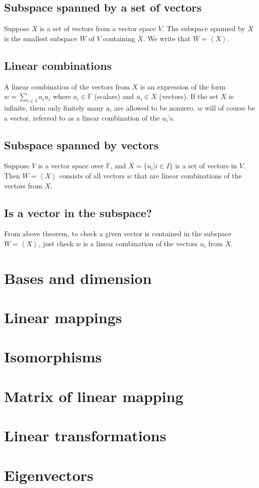 \documentclass[12pt]{article}
\begin{document}
	\subsection{Subspace spanned by a set of vectors}
	\begin{thm}
		Suppose $X$ is a set of vectors from a vector space $V$. The subspace spanned by $X$ is the smallest subspace $W$ of $V$ containing $X$. We write that $W = \left< X \right>$.
	\end{thm}
	
	\subsection{Linear combinations}
	\begin{defn}
		A linear combination of the vectors from $X$ is an expression of the form $w = \sum_{i \in I} a_i u_i$ where $a_i \in \mathbb{F}$ (scalars) and $u_i \in X$ (vectors).
		If the set $X$ is infinite, them only finitely many $a_i$ are allowed to be nonzero. $w$ will of course be a vector, referred to as a linear combination of the $u_i$'s.
	\end{defn}
	
	\subsection{Subspace spanned by vectors}
	\begin{thm}
		Suppose $V$ is a vector space over $\mathbb{F}$, and $X = \{ u_i | i \in I \}$ is a set of vectors in $V$. Then $W=\left< X \right>$ consists of all vectors $w$ that are linear
		combinations of the vectors from $X$.
	\end{thm}
	
	\subsection{Is a vector in the subspace?}
	From above theorem, to check a given vector is contained in the subspace $W=\left< X \right>$, just check $w$ is a linear combination of the vectors $u_i$ from $X$.

\section{Bases and dimension}
	\begin{defn}
	\end{defn}

\section{Linear mappings}
\section{Isomorphisms}
\section{Matrix of linear mapping}
\section{Linear transformations}
\section{Eigenvectors}
\end{document}
